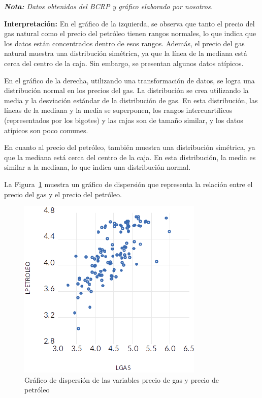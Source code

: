 \documentclass[
  a4paper,
]{article}
\begin{document}
\emph{\textbf{Nota:} Datos obtenidos del BCRP y gráfico elaborado por
nosotros.}

\textbf{Interpretación:} En el gráfico de la izquierda, se observa que
tanto el precio del gas natural como el precio del petróleo tienen
rangos normales, lo que indica que los datos están concentrados dentro
de esos rangos. Además, el precio del gas natural muestra una
distribución simétrica, ya que la línea de la mediana está cerca del
centro de la caja. Sin embargo, se presentan algunos datos atípicos.

En el gráfico de la derecha, utilizando una transformación de datos, se
logra una distribución normal en los precios del gas. La distribución se
crea utilizando la media y la desviación estándar de la distribución de
gas. En esta distribución, las líneas de la mediana y la media se
superponen, los rangos intercuartílicos (representados por los bigotes)
y las cajas son de tamaño similar, y los datos atípicos son poco
comunes.

En cuanto al precio del petróleo, también muestra una distribución
simétrica, ya que la mediana está cerca del centro de la caja. En esta
distribución, la media es similar a la mediana, lo que indica una
distribución normal.

La Figura~\ref{fig-11} muestra un gráfico de dispersión que representa
la relación entre el precio del gas y el precio del petróleo.

\begin{figure}

\caption{\label{fig-11}Gráfico de dispersión de las variables precio de
gas y precio de petróleo}

{\centering \includegraphics{20230603091904.png}

}

\end{figure}
\end{document}
